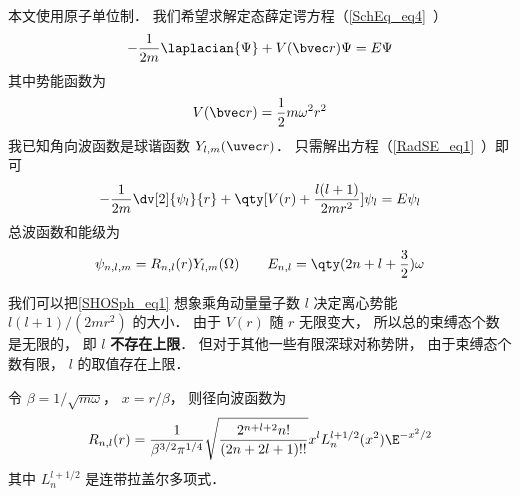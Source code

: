 
\begin{issues}
\issueDraft
\end{issues}


本文使用原子单位制． 我们希望求解定态薛定谔方程（\autoref{SchEq_eq4}~）
\begin{equation}
-\frac{1}{2m} \laplacian {\Psi} + V(\bvec r)\Psi = E \Psi
\end{equation}
其中势能函数为
\begin{equation}
V(\bvec r) = \frac{1}{2}m\omega^2 r^2
\end{equation}
我已知角向波函数是球谐函数 $Y_{l,m}(\uvec r)$． 只需解出方程（\autoref{RadSE_eq1}~）即可
\begin{equation}\label{SHOSph_eq1}
-\frac{1}{2m} \dv[2]{\psi_l}{r} + \qty[V(r) + \frac{l(l + 1)}{2mr^2}]\psi_l = E\psi_l
\end{equation}
总波函数和能级为
\begin{equation}
\psi_{n,l,m} = R_{n,l}(r) Y_{l,m}(\Omega)
\qquad
E_{n,l} = \qty(2n + l + \frac32) \omega
\end{equation}    

我们可以把\autoref{SHOSph_eq1} 想象乘角动量量子数 $l$ 决定离心势能 $l(l + 1)/(2mr^2)$  的大小． 由于 $V(r)$ 随 $r$ 无限变大， 所以总的束缚态个数是无限的， 即 $l$ \textbf{不存在上限}． 但对于其他一些有限深球对称势阱， 由于束缚态个数有限， $l$ 的取值存在上限．

令 $\beta = 1/\sqrt{m\omega}$， $x = r/\beta$， 则径向波函数为
\begin{equation}
R_{n,l}(r) = \frac{1}{\beta^{3/2} \pi^{1/4}} \sqrt{\frac{2^{n+l+2} n!}{(2n + 2l + 1)!!}} x^l L_n^{l+1/2}(x^2) \E^{-x^2/2}
\end{equation}
其中 $L_n^{l+1/2}$ 是连带拉盖尔多项式．

